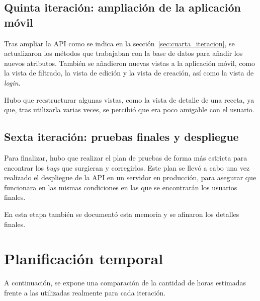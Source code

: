 \subsection{Quinta iteración: ampliación de la aplicación móvil}
\label{sec:quinta_iteracion}

Tras ampliar la API como se indica en la sección~\ref{sec:cuarta_iteracion},
se actualizaron los métodos que trabajaban con la base de datos para añadir
los nuevos atributos. También se añadieron nuevas vistas a la aplicación móvil,
como la vista de filtrado, la vista de edición y la vista de creación, así como
la vista de \textit{login}.

Hubo que reestructurar algunas vistas, como la vista de detalle de una receta,
ya que, tras utilizarla varias veces, se percibió que era poco amigable con el
usuario.

\subsection{Sexta iteración: pruebas finales y despliegue}
\label{sec:sexta_iteracion}

Para finalizar, hubo que realizar el plan de pruebas de forma más estricta para
encontrar los \textit{bugs} que surgieran y corregirlos. Este plan se llevó a
cabo una vez realizado el despliegue de la API en un servidor en producción, para
asegurar que funcionara en las mismas condiciones en las que se encontrarán los
usuarios finales.

En esta etapa también se documentó esta memoria y se afinaron los detalles
finales.


\section{Planificación temporal}
\label{sec:planificacion}

A continuación, se expone una comparación de la cantidad de horas estimadas
frente a las utilizadas realmente para cada iteración.

